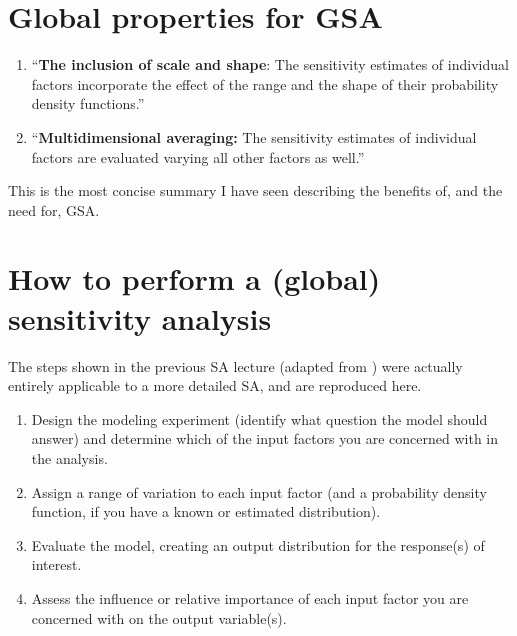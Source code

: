 \documentclass[10pt]{article}
\begin{document}
\section{Global properties for GSA}

\begin{enumerate}
    \setlength{\itemsep}{0pt}%
    \setlength{\parskip}{0pt}%
     \item ``\textbf{The inclusion of scale and shape}: The sensitivity estimates of individual factors incorporate the effect of the range and the shape of their probability density functions.'' \cite{Saltelli2009-tz}
     \item ``\textbf{Multidimensional averaging:} The sensitivity estimates of individual factors are evaluated varying all other factors as well.'' \cite{Saltelli2009-tz}

\end{enumerate}

This is the most concise summary I have seen describing the benefits of, and the need for, GSA.

\section{How to perform a (global) sensitivity analysis}

The steps shown in the previous SA lecture (adapted from \cite{Saltelli2009-tz}) were actually entirely applicable to a more detailed SA, and are reproduced here.

\begin{enumerate}
    \setlength{\itemsep}{0pt}%
    \setlength{\parskip}{0pt}%
    \item Design the modeling experiment (identify what question the model should answer) and determine which of the input factors you are concerned with in the analysis.
    \item Assign a range of variation to each input factor (and a probability density function, if you have a known or estimated distribution).
    \item Evaluate the model, creating an output distribution for the response(s) of interest.
    \item Assess the influence or relative importance of each input factor you are concerned with on the output variable(s).
\end{enumerate}
\end{document}
